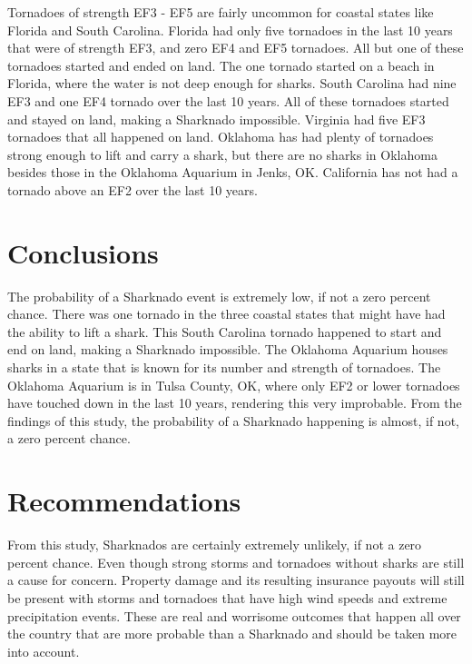 \documentclass[
  letterpaper,
  DIV=11,
  numbers=noendperiod]{scrreprt}
\begin{document}
Tornadoes of strength EF3 - EF5 are fairly uncommon for coastal states
like Florida and South Carolina. Florida had only five tornadoes in the
last 10 years that were of strength EF3, and zero EF4 and EF5 tornadoes.
All but one of these tornadoes started and ended on land. The one
tornado started on a beach in Florida, where the water is not deep
enough for sharks. South Carolina had nine EF3 and one EF4 tornado over
the last 10 years. All of these tornadoes started and stayed on land,
making a Sharknado impossible. Virginia had five EF3 tornadoes that all
happened on land. Oklahoma has had plenty of tornadoes strong enough to
lift and carry a shark, but there are no sharks in Oklahoma besides
those in the Oklahoma Aquarium in Jenks, OK. California has not had a
tornado above an EF2 over the last 10 years.

\section{Conclusions}\label{conclusions}

The probability of a Sharknado event is extremely low, if not a zero
percent chance. There was one tornado in the three coastal states that
might have had the ability to lift a shark. This South Carolina tornado
happened to start and end on land, making a Sharknado impossible. The
Oklahoma Aquarium houses sharks in a state that is known for its number
and strength of tornadoes. The Oklahoma Aquarium is in Tulsa County, OK,
where only EF2 or lower tornadoes have touched down in the last 10
years, rendering this very improbable. From the findings of this study,
the probability of a Sharknado happening is almost, if not, a zero
percent chance.

\section{Recommendations}\label{recommendations}

From this study, Sharknados are certainly extremely unlikely, if not a
zero percent chance. Even though strong storms and tornadoes without
sharks are still a cause for concern. Property damage and its resulting
insurance payouts will still be present with storms and tornadoes that
have high wind speeds and extreme precipitation events. These are real
and worrisome outcomes that happen all over the country that are more
probable than a Sharknado and should be taken more into account.

\end{document}
